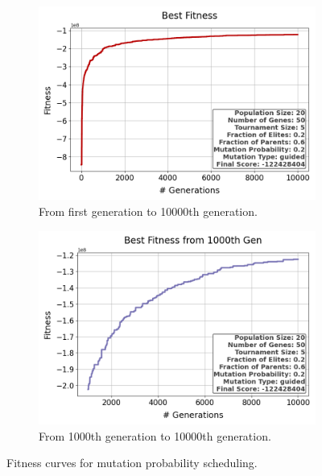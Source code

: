 \documentclass{assignment}
\begin{document}
\begin{figure}[H]
    \begin{subfigure}{0.5\textwidth}
        \includegraphics[width=\textwidth]{figures/best_fitness_outputPROB_20_50_5_0.2_0.6_0.2_guided.png}
        \caption{From first generation to 10000th generation.}
    \end{subfigure}\hfill
    \begin{subfigure}{0.5\textwidth}
        \includegraphics[width=\textwidth]{figures/best_fitness_1000_outputPROB_20_50_5_0.2_0.6_0.2_guided.png}
        \caption{From 1000th generation to 10000th generation.}
    \end{subfigure}
    \caption{Fitness curves for mutation probability scheduling.}
\label{fig:dynamic_mutation}
\end{figure}
\end{document}
